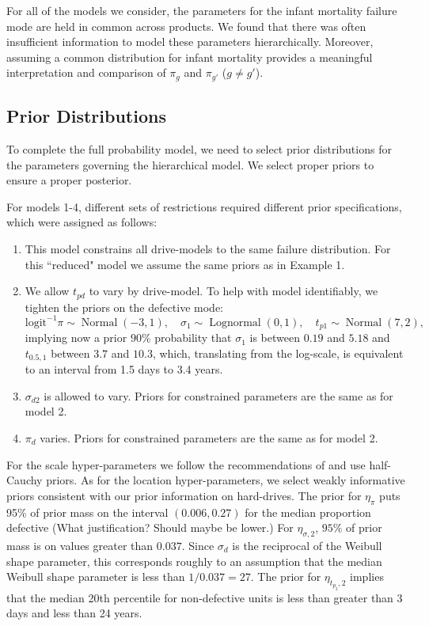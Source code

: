 \documentclass[12pt]{article}
\newcommand{\op}{\operatorname}
\begin{document}
For all of the models we consider, the parameters for the infant mortality failure mode are held in common across products.  We found that there was often insufficient information to model these parameters hierarchically.  Moreover, assuming a common distribution for infant mortality provides a meaningful interpretation and comparison of $\pi_g$ and $\pi_{g'}$ ($g \neq g'$). 

\subsection{Prior Distributions}
\label{sec:Prior Distributions}
To complete the full probability model, we need to select prior distributions for the parameters governing the hierarchical model. We select proper priors to ensure a proper posterior.

For models 1-4, different sets of restrictions required different prior specifications, which were assigned as follows:

\begin{enumerate}
\item This model constrains all drive-models to the same failure distribution. For this ``reduced" model we assume the same priors as in Example 1.

\item We allow $t_{pd}$ to vary by drive-model. To help with model identifiably, we tighten the priors on the defective mode:
$$ \mbox{logit}^{-1}\pi \sim \op{Normal}(-3,1),\quad \sigma_1 \sim \op{Lognormal}(0, 1), \quad t_{p1} \sim \op{Normal}(7,2),$$
implying now a prior $90\%$ probability that $\sigma_1$ is between $0.19$ and $5.18$ and $t_{0.5,1}$ between $3.7$ and $10.3$, which, translating from the log-scale, is equivalent to an interval from 1.5 days to 3.4 years.

\item $\sigma_{d2}$ is allowed to vary. Priors for constrained parameters are the same as for model 2.

\item $\pi_d$ varies. Priors for constrained parameters are the same as for model 2.

\end{enumerate}

For the scale hyper-parameters we follow the recommendations of \citet{gelman2014bayesian} and use half-Cauchy priors. As for the location hyper-parameters, we select weakly informative priors consistent with our prior information on hard-drives. The prior for $\eta_\pi$ puts 95\% of prior mass on the interval $(0.006, 0.27)$ for the median proportion defective (What justification? Should maybe be lower.) For $\eta_{\sigma, 2}$, $95\%$ of prior mass is on values greater than $0.037$. Since $\sigma_d$ is the reciprocal of the Weibull shape parameter, this corresponds roughly to an assumption that the median Weibull shape parameter is less than $1/0.037 = 27$. The prior for $\eta_{t_{p_2},2}$ implies that the median 20th percentile for non-defective units is less than greater than 3 days and less than 24 years.
\end{document}
